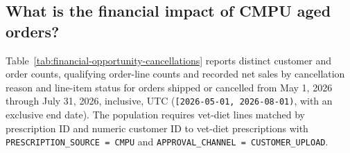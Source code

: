 \subsection{What is the financial impact of CMPU aged orders?}
\label{subsec:financial-opportunity-analysis}
Table~\ref{tab:financial-opportunity-cancellations} reports distinct customer and order counts,
qualifying order-line counts and recorded net sales by cancellation reason and line-item status
for orders shipped or cancelled from May 1, 2026 through July 31, 2026, inclusive, UTC
(\texttt{[2026-05-01, 2026-08-01)}, with an exclusive end date).
The population requires vet-diet lines matched by prescription ID and numeric
customer ID to vet-diet prescriptions with
\texttt{PRESCRIPTION\_SOURCE = CMPU} and
\texttt{APPROVAL\_CHANNEL = CUSTOMER\_UPLOAD}.



